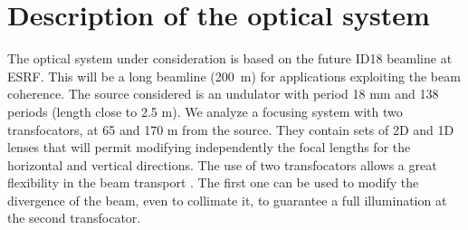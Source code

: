 \documentclass{iucr}              %
\begin{document}



\section{Description of the optical system}
\label{sec:beamline}

The optical system under consideration is based on the future ID18 beamline at ESRF. This will be a long beamline (200~m) for applications exploiting the beam coherence. The source considered is an undulator with period 18 mm and 138 periods (length close to 2.5 m).  
We analyze a focusing system with two transfocators, at 65 and 170 m from the source. They contain sets of 2D and 1D lenses that will permit modifying independently the focal lengths for the horizontal and vertical directions. The use of two transfocators allows a great flexibility in the beam transport \cite{Vaughan:kv5084}. The first one can be used to modify the divergence of the beam, even to collimate it, to guarantee a full illumination at the second transfocator.  
\end{document}
